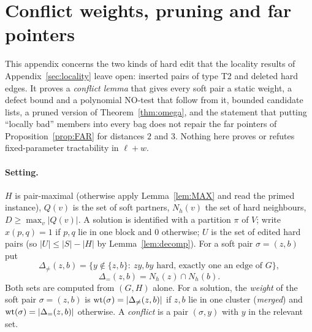\section{Conflict weights, pruning and far pointers}\label{app:conflicts}\label{sec:pointers}
This appendix concerns the two kinds of hard edit that the locality results of Appendix~\ref{sec:locality} leave open: inserted pairs of type T2 and deleted hard edges. It proves a \emph{conflict lemma} that gives every soft pair a static weight, a defect bound and a polynomial NO-test that follow from it, bounded candidate lists, a pruned version of Theorem~\ref{thm:omega}, and the statement that putting ``locally bad'' members into every bag does not repair the far pointers of Proposition~\ref{prop:FAR} for distances $2$ and $3$. Nothing here proves or refutes fixed-parameter tractability in $\ell+w$.

\paragraph{Setting.}
$H$ is pair-maximal (otherwise apply Lemma~\ref{lem:MAX} and read the primed instance), $Q(v)$ is the set of soft partners, $N_h(v)$ the set of hard neighbours, $D\ge\max_v|Q(v)|$. A solution is identified with a partition $\pi$ of $V$; write $x(p,q)=1$ if $p,q$ lie in one block and $0$ otherwise; $U$ is the set of edited hard pairs (so $|U|\le|S|-|H|$ by Lemma~\ref{lem:decomp}). For a soft pair $\sigma=(z,b)$ put
\[
\Delta_{\neq}(z,b)=\{y\notin\{z,b\}:\ zy,by\text{ hard, exactly one an edge of }G\},
\]
\[
\Delta_{=}(z,b)=N_h(z)\cap N_h(b).
\]
Both sets are computed from $(G,H)$ alone. For a solution, the \emph{weight} of the soft pair $\sigma=(z,b)$ is $\mathrm{wt}(\sigma)=|\Delta_{\neq}(z,b)|$ if $z,b$ lie in one cluster (\emph{merged}) and $\mathrm{wt}(\sigma)=|\Delta_{=}(z,b)|$ otherwise. A \emph{conflict} is a pair $(\sigma,y)$ with $y$ in the relevant set.

